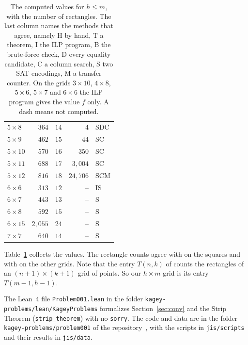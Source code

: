 \begin{table}[!htb]
\begin{tabular}{@{}lrrrl@{}}
\midrule
$5\times8$ & $364$ & $14$ & $4$ & SDC \\
$5\times9$ & $462$ & $15$ & $44$ & SC \\
$5\times10$ & $570$ & $16$ & $350$ & SC \\
$5\times11$ & $688$ & $17$ & $3{,}004$ & SC \\
$5\times12$ & $816$ & $18$ & $24{,}706$ & SCM \\
$6\times6$ & $313$ & $12$ & -- & IS \\
$6\times7$ & $443$ & $13$ & -- & S \\
$6\times8$ & $592$ & $15$ & -- & S \\
$6\times15$ & $2{,}055$ & $24$ & -- & S \\
$7\times7$ & $640$ & $14$ & -- & S \\
\bottomrule
\end{tabular}
\caption{The computed values for $h\le m$, with the number of rectangles. The last column
names the methods that agree, namely H by hand, T a theorem, I the ILP program, B the
brute-force check, D every equality candidate, C a column search, S two SAT encodings, M a
transfer counter. On the grids $3\times10$, $4\times8$, $5\times6$, $5\times7$ and $6\times6$ the ILP program gives the value $f$ only. A dash means not computed.}
\label{tab:values}
\end{table}

Table~\ref{tab:values} collects the values. The rectangle counts agree with
 on the squares and with  on the other grids. Note that the
entry $T(n,k)$ of  counts the rectangles of an $(n+1)\times(k+1)$ grid of
points. So our $h\times m$ grid is its entry $T(m-1,h-1)$.

The Lean~4 file \nolinkurl{Problem001.lean} in the folder
\nolinkurl{kagey-problems/lean/KageyProblems} formalizes Section~\ref{sec:conv} and the Strip Theorem (\texttt{strip\_theorem}) with no
\texttt{sorry}. The code and data are in the folder \nolinkurl{kagey-problems/problem001} of
the repository~\cite{repo}, with the scripts in
\nolinkurl{jis/scripts} and their results in \nolinkurl{jis/data}.
